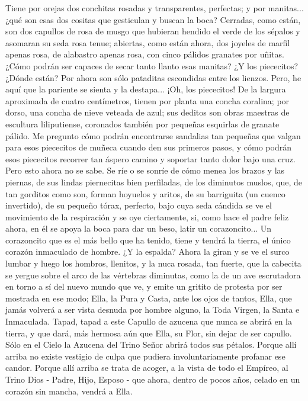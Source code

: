 \documentclass[12pt]{book} %
\begin{document}
Tiene por orejas dos conchitas rosadas y transparentes, perfectas; y por manitas... ¿qué son esas dos cositas que gesticulan y buscan la boca? Cerradas, como están, son dos capullos de rosa de musgo que hubieran hendido el verde de los sépalos y asomaran su seda rosa tenue; abiertas, como están ahora, dos joyeles de marfil apenas rosa, de alabastro apenas rosa, con cinco pálidos granates por uñitas. ¿Cómo podrán ser capaces de secar tanto llanto esas manitas? ¿Y los piececitos? ¿Dónde están? Por ahora son sólo pataditas escondidas entre los lienzos. Pero, he aquí que la pariente se sienta y la destapa... ¡Oh, los piececitos! De la largura aproximada de cuatro centímetros, tienen por planta una concha coralina; por dorso, una concha de nieve veteada de azul; sus deditos son obras maestras de escultura liliputiense, coronados también por pequeñas esquirlas de granate pálido. Me pregunto cómo podrán encontrarse sandalias tan pequeñas que valgan para esos piececitos de muñeca cuando den sus primeros pasos, y cómo podrán esos piececitos recorrer tan áspero camino y soportar tanto dolor bajo una cruz. Pero esto ahora no se sabe. Se ríe o se sonríe de cómo menea los brazos y las piernas, de sus lindas piernecitas bien perfiladas, de los diminutos muslos, que, de tan gorditos como son, forman hoyuelos y aritos, de su barriguita (un cuenco invertido), de su pequeño tórax, perfecto, bajo cuya seda cándida se ve el movimiento de la respiración y se oye ciertamente, si, como hace el padre feliz ahora, en él se apoya la boca para dar un beso, latir un corazoncito... Un corazoncito que es el más bello que ha tenido, tiene y tendrá la tierra, el único corazón inmaculado de hombre. ¿Y la espalda? Ahora la giran y se ve el surco lumbar y luego los hombros, llenitos, y la nuca rosada, tan fuerte, que la cabecita se yergue sobre el arco de las vértebras diminutas, como la de un ave escrutadora en torno a sí del nuevo mundo que ve, y emite un gritito de protesta por ser mostrada en ese modo; Ella, la Pura y Casta, ante los ojos de tantos, Ella, que jamás volverá a ser vista desnuda por hombre alguno, la Toda Virgen, la Santa e Inmaculada. Tapad, tapad a este Capullo de azucena que nunca se abrirá en la tierra, y que dará, más hermosa aún que Ella, su Flor, sin dejar de ser capullo. Sólo en el Cielo la Azucena del Trino Señor abrirá todos sus pétalos. Porque allí arriba no existe vestigio de culpa que pudiera involuntariamente profanar ese candor. Porque allí arriba se trata de acoger, a la vista de todo el Empíreo, al Trino Dios - Padre, Hijo, Esposo - que ahora, dentro de pocos años, celado en un corazón sin mancha, vendrá a Ella. 
\end{document}
